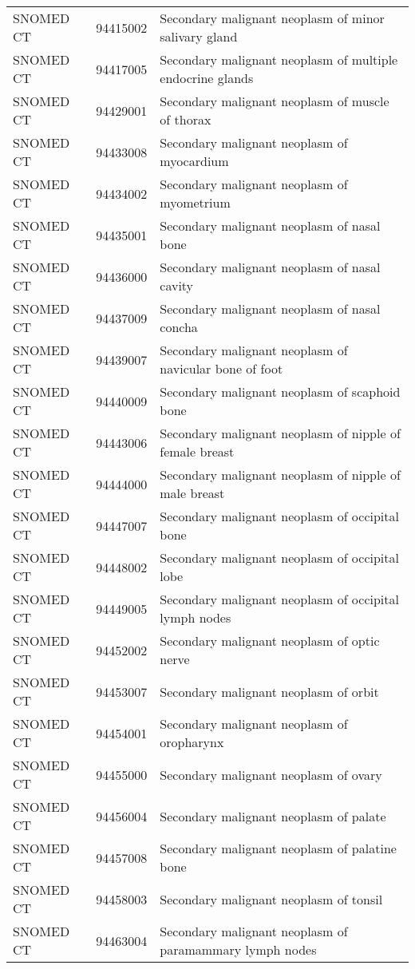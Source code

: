 \begin{longtable}{p{}p{}p{}}
  SNOMED CT & 94415002 & Secondary malignant neoplasm of minor salivary gland \\ 
  SNOMED CT & 94417005 & Secondary malignant neoplasm of multiple endocrine glands \\ 
  SNOMED CT & 94429001 & Secondary malignant neoplasm of muscle of thorax \\ 
  SNOMED CT & 94433008 & Secondary malignant neoplasm of myocardium \\ 
  SNOMED CT & 94434002 & Secondary malignant neoplasm of myometrium \\ 
  SNOMED CT & 94435001 & Secondary malignant neoplasm of nasal bone \\ 
  SNOMED CT & 94436000 & Secondary malignant neoplasm of nasal cavity \\ 
  SNOMED CT & 94437009 & Secondary malignant neoplasm of nasal concha \\ 
  SNOMED CT & 94439007 & Secondary malignant neoplasm of navicular bone of foot \\ 
  SNOMED CT & 94440009 & Secondary malignant neoplasm of scaphoid bone \\ 
  SNOMED CT & 94443006 & Secondary malignant neoplasm of nipple of female breast \\ 
  SNOMED CT & 94444000 & Secondary malignant neoplasm of nipple of male breast \\ 
  SNOMED CT & 94447007 & Secondary malignant neoplasm of occipital bone \\ 
  SNOMED CT & 94448002 & Secondary malignant neoplasm of occipital lobe \\ 
  SNOMED CT & 94449005 & Secondary malignant neoplasm of occipital lymph nodes \\ 
  SNOMED CT & 94452002 & Secondary malignant neoplasm of optic nerve \\ 
  SNOMED CT & 94453007 & Secondary malignant neoplasm of orbit \\ 
  SNOMED CT & 94454001 & Secondary malignant neoplasm of oropharynx \\ 
  SNOMED CT & 94455000 & Secondary malignant neoplasm of ovary \\ 
  SNOMED CT & 94456004 & Secondary malignant neoplasm of palate \\ 
  SNOMED CT & 94457008 & Secondary malignant neoplasm of palatine bone \\ 
  SNOMED CT & 94458003 & Secondary malignant neoplasm of tonsil \\ 
  SNOMED CT & 94463004 & Secondary malignant neoplasm of paramammary lymph nodes \\ 

\end{longtable}
